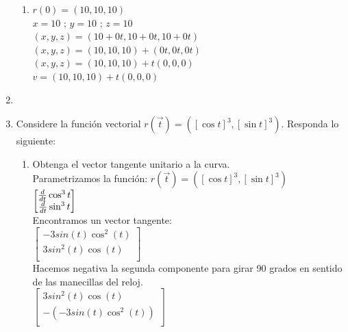 \documentclass[10pt,letterpaper,fleqn]{article}
\begin{document}
\begin{enumerate}
\begin{enumerate}
            \item $r(0)=(10,10,10)$ \\
            $x=10$ ; $y=10$ ; $z=10$ \\
            $(x,y,z) = (10+0t,10+0t,10+0t)$ \\
            $(x,y,z) = (10,10,10)+(0t,0t,0t)$ \\
            $(x,y,z) = (10,10,10)+t(0,0,0)$ \\ 
            $v = (10,10,10)+t(0,0,0)$

        \end{enumerate}

        \item

        \item Considere la función vectorial $r(\overrightarrow{t})= ([\cos t]^3,[\sin t]^3)$. Responda lo siguiente:
        \begin{enumerate}
            \item Obtenga el vector tangente unitario a la curva. \\
            Parametrizamos la función:
            $r(\overrightarrow{t})= ([\cos t]^3,[\sin t]^3)$ \\
            $\begin{bmatrix}
            {d \over dt} \cos^3 t \\
            {d \over dt} \sin^3 t \\
            \end{bmatrix}$ \\
            Encontramos un vector tangente: \\
            $\begin{bmatrix}
            -3sin(t)\cos^2(t) \\
            3sin^2(t)\cos(t) \\
            \end{bmatrix}$ \\
            Hacemos negativa la segunda componente para girar 90 grados en sentido de las manecillas del reloj. \\
            $\begin{bmatrix}
            3sin^2(t)\cos(t) \\
            -(-3sin(t)\cos^2(t))\\
            \end{bmatrix}$ \\

\end{enumerate}
\end{enumerate}
\end{document}
